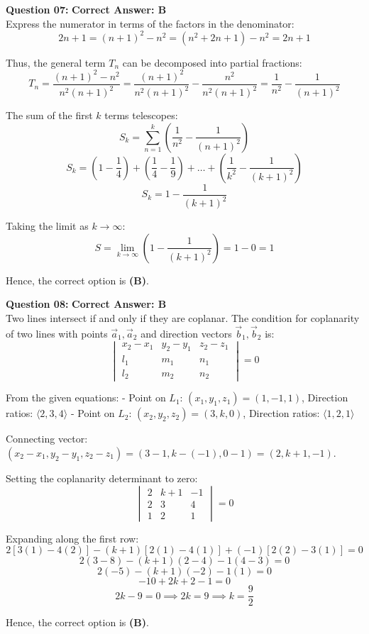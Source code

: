 \documentclass[11pt,a4paper]{article}
\begin{document}
\begin{tcolorbox}[solbox]
\textbf{\textcolor{primaryDark}{Question 07:}} \hfill \textbf{\textcolor{l1Green}{Correct Answer: B}}\\
\vspace{4pt}
Express the numerator in terms of the factors in the denominator:
$$2n + 1 = (n + 1)^2 - n^2 = (n^2 + 2n + 1) - n^2 = 2n + 1$$

Thus, the general term $T_n$ can be decomposed into partial fractions:
$$T_n = \frac{(n + 1)^2 - n^2}{n^2(n + 1)^2} = \frac{(n + 1)^2}{n^2(n + 1)^2} - \frac{n^2}{n^2(n + 1)^2} = \frac{1}{n^2} - \frac{1}{(n + 1)^2}$$

The sum of the first $k$ terms telescopes:
$$S_k = \sum_{n=1}^k \left( \frac{1}{n^2} - \frac{1}{(n + 1)^2} \right)$$
$$S_k = \left(1 - \frac{1}{4}\right) + \left(\frac{1}{4} - \frac{1}{9}\right) + \dots + \left(\frac{1}{k^2} - \frac{1}{(k+1)^2}\right)$$
$$S_k = 1 - \frac{1}{(k + 1)^2}$$

Taking the limit as $k \to \infty$:
$$S = \lim_{k \to \infty} \left( 1 - \frac{1}{(k + 1)^2} \right) = 1 - 0 = 1$$

Hence, the correct option is \textbf{(B)}.
\end{tcolorbox}

\begin{tcolorbox}[solbox]
\textbf{\textcolor{primaryDark}{Question 08:}} \hfill \textbf{\textcolor{l1Green}{Correct Answer: B}}\\
\vspace{4pt}
Two lines intersect if and only if they are coplanar. The condition for coplanarity of two lines with points $\vec{a}_1, \vec{a}_2$ and direction vectors $\vec{b}_1, \vec{b}_2$ is:
$$\begin{vmatrix} x_2 - x_1 & y_2 - y_1 & z_2 - z_1 \\ l_1 & m_1 & n_1 \\ l_2 & m_2 & n_2 \end{vmatrix} = 0$$

From the given equations:
- Point on $L_1$: $(x_1, y_1, z_1) = (1, -1, 1)$, Direction ratios: $\langle 2, 3, 4 \rangle$
- Point on $L_2$: $(x_2, y_2, z_2) = (3, k, 0)$, Direction ratios: $\langle 1, 2, 1 \rangle$

Connecting vector: $(x_2 - x_1, y_2 - y_1, z_2 - z_1) = (3 - 1, k - (-1), 0 - 1) = (2, k + 1, -1)$.

Setting the coplanarity determinant to zero:
$$\begin{vmatrix} 2 & k + 1 & -1 \\ 2 & 3 & 4 \\ 1 & 2 & 1 \end{vmatrix} = 0$$

Expanding along the first row:
$$2 [3(1) - 4(2)] - (k + 1)[2(1) - 4(1)] + (-1)[2(2) - 3(1)] = 0$$
$$2(3 - 8) - (k + 1)(2 - 4) - 1(4 - 3) = 0$$
$$2(-5) - (k + 1)(-2) - 1(1) = 0$$
$$-10 + 2k + 2 - 1 = 0$$
$$2k - 9 = 0 \implies 2k = 9 \implies k = \frac{9}{2}$$

Hence, the correct option is \textbf{(B)}.
\end{tcolorbox}
\end{document}
